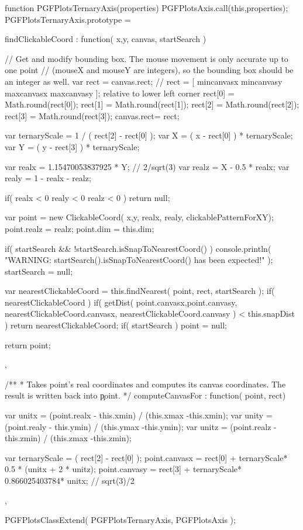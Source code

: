 function PGFPlotsTernaryAxis(properties) {
	PGFPlotsAxis.call(this,properties);
}
PGFPlotsTernaryAxis.prototype = {
	findClickableCoord : function( x,y, canvas, startSearch )
	{
		// Get and modify bounding box. The mouse movement is only accurate up to one point
		// (mouseX and mouseY are integers), so the bounding box should be an integer as well.
		var rect = canvas.rect; // rect = [ mincanvasx mincanvasy maxcanvasx maxcanvasy ]; relative to lower left corner
		rect[0] = Math.round(rect[0]);
		rect[1] = Math.round(rect[1]);
		rect[2] = Math.round(rect[2]);
		rect[3] = Math.round(rect[3]);
		canvas.rect= rect;

		var ternaryScale = 1 / ( rect[2] - rect[0] );
		var X = ( x - rect[0] ) * ternaryScale;
		var Y = ( y - rect[3] ) * ternaryScale;

		var realx = 1.15470053837925 * Y; // 2/sqrt(3)
		var realz = X - 0.5 * realx;
		var realy = 1 - realx - realz;

		if( realx < 0 \pgfplotsVERTBAR\pgfplotsVERTBAR realy < 0 \pgfplotsVERTBAR\pgfplotsVERTBAR realz < 0 )
			return null;

		var point = new ClickableCoord( x,y, realx, realy, clickablePatternForXY);
		point.realz = realz;
		point.dim = this.dim;

		if( startSearch && !startSearch.isSnapToNearestCoord() ) {
			console.println( "WARNING: startSearch().isSnapToNearestCoord() has been expected!" );
			startSearch = null;
		}

		var nearestClickableCoord = this.findNearest( point, rect, startSearch );
		if( nearestClickableCoord ) {
			if( getDist( point.canvasx,point.canvasy,  nearestClickableCoord.canvasx, nearestClickableCoord.canvasy ) < this.snapDist ) {
				return nearestClickableCoord;
			}
		}
		if( startSearch )
			point = null;

		return point;
	},

	/**
	 * Takes point's real coordinates and computes its canvas coordinates. The result is written back into \c point.
	 */
	computeCanvasFor : function( point, rect)
	{
		var unitx = (point.realx - this.xmin) / (this.xmax -this.xmin);
		var unity = (point.realy - this.ymin) / (this.ymax -this.ymin);
		var unitz = (point.realz - this.zmin) / (this.zmax -this.zmin);

		var ternaryScale = ( rect[2] - rect[0] );
		point.canvasx = rect[0] + ternaryScale* 0.5 * (unitx + 2 * unitz);
		point.canvasy = rect[3] + ternaryScale* 0.866025403784* unitx; // sqrt(3)/2
	},
}
PGFPlotsClassExtend( PGFPlotsTernaryAxis, PGFPlotsAxis );



